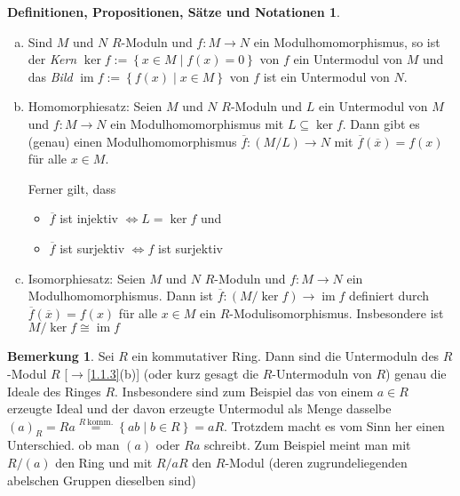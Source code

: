 \documentclass[
twoside=semi,
fontsize=12,
DIV=12, 
cleardoublepage=current,
leqno,
headings=optiontoheadandtoc, 
toc=idx
]{scrbook}
\newcommand{\set}[1]{\left\{ #1 \right\}}
\DeclareMathOperator{\im}{im}
\theoremstyle{definition}
\newtheorem{bemerkung}[definition]{Bemerkung}
\newtheorem{def-prop-satz-not}[definition]{Definitionen, Propositionen, S\"atze und Notationen}
\begin{document}
\begin{def-prop-satz-not}
\begin{enumerate}[(a)]
			Ist $N$ ein Untermodul von $M$, so nennt man $M/N := M/\equiv_N$ auch den \emph{Quotientenmodul} von $M$ nach $N$.
			
			\item Sind $M$ und $N$ $R$-Moduln und $f:M \to N$ ein Modulhomomorphismus, so ist der \emph{Kern} $\ker f := \set{x \in M \mid f(x) = 0}$ von $f$ ein Untermodul von $M$ und das \emph{Bild} $\im f := \set{f(x) \mid x \in M}$ von $f$ ist ein Untermodul von $N$.
			
			\item Homomorphiesatz: Seien $M$ und $N$ $R$-Moduln und $L$ ein Untermodul von $M$ und $f:M \to N$ ein Modulhomomorphismus mit $L \subseteq \ker f$. Dann gibt es (genau) einen Modulhomomorphismus $\overline{f}: (M/L) \to N$ mit $\overline{f}(\overline{x}) = f(x)$ f\"ur alle $x \in M$.
			
			Ferner gilt, dass
			\begin{itemize}
				\item $\overline{f}$ ist injektiv $\Leftrightarrow L = \ker f$ und
				\item $\overline{f}$ ist surjektiv $\Leftrightarrow f$ ist surjektiv
			\end{itemize}
			
			\item Isomorphiesatz: Seien $M$ und $N$ $R$-Moduln und $f:M \to N$ ein Modulhomomorphismus. Dann ist $\overline{f}:(M/\ker f) \to \im f$ definiert durch $\overline{f}(\overline{x}) = f(x)$ f\"ur alle $x\in M$ ein $R$-Modulisomorphismus. Insbesondere ist $M/\ker f \cong \im f$
		\end{enumerate}
	\end{def-prop-satz-not}
	
	\begin{bemerkung}\label{1.1.5}\hfill\newline
		Sei $R$ ein kommutativer Ring. Dann sind die Untermoduln des $R$-Modul $R$ [$\to$\ref{1.1.3}(b)] (oder kurz gesagt die $R$-Untermoduln von $R$) genau die Ideale des Ringes $R$.
		Insbesondere sind zum Beispiel das von einem $a \in R$ erzeugte Ideal und der davon erzeugte Untermodul als Menge dasselbe $(a)_R = Ra \overset{R\ \textrm{komm.}}{=} \set{ab \mid b \in R} = aR$.
		Trotzdem macht es vom Sinn her einen Unterschied. ob man $(a)$ oder $Ra$ schreibt. Zum Beispiel meint man mit $R/(a)$ den Ring und mit $R/aR$ den $R$-Modul (deren zugrundeliegenden abelschen Gruppen dieselben sind)
	\end{bemerkung}
\end{document}
